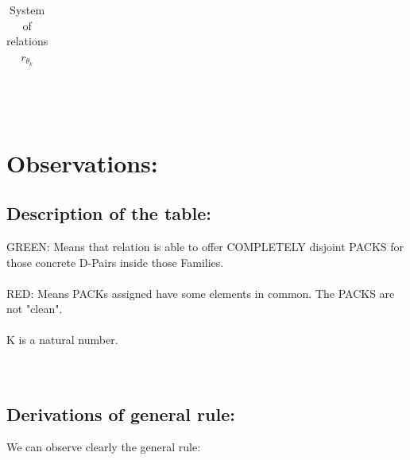 \begin{table}[h!]
\begin{center}
\begin{tabular}{|l|l|| l|l|l|l|l|l|l|l| l |l|l|l| l|}
			\end{tabular}
			\caption{System of relations $r_{\theta_{k}}$}
			\label{tab: system_relations_r_theta_k}
		\end{center}
	\end{table}
	\\\\
	
	\newpage
	
	\section{Observations:}
	
	\subsection{Description of the table:}
	
	\noindent
	GREEN: Means that relation is able to offer COMPLETELY disjoint PACKS for those concrete D-Pairs inside those Families.\\\\
	RED: Means PACKs assigned have some elements in common. The PACKS are not "clean".\\\\
	K is a natural number.\\
	\\\\
	
	\subsection{Derivations of general rule:}
	
	\noindent
	We can observe clearly the general rule:\\
	\\\\
	
